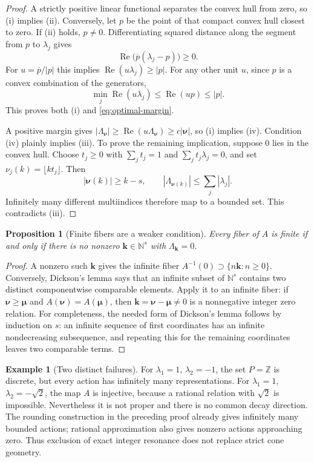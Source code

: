\documentclass[11pt,a4paper]{article}
\numberwithin{equation}{section}
\newtheorem{proposition}[theorem]{Proposition}
\theoremstyle{definition}
\newtheorem{example}[theorem]{Example}
\theoremstyle{remark}
\newcommand{\N}{\mathbb N}
\newcommand{\Z}{\mathbb Z}
\newcommand{\Rea}{\operatorname{Re}}
\newcommand{\nn}{\boldsymbol\nu}
\newcommand{\mm}{\boldsymbol\mu}
\newcommand{\kk}{\boldsymbol k}
\begin{document}
\begin{proof}
A strictly positive linear functional separates the convex hull from zero,
so (i) implies (ii). Conversely, let $p$ be the point of that compact convex
hull closest to zero. If (ii) holds, $p\ne0$. Differentiating squared distance
along the segment from $p$ to $\lambda_j$ gives
\[
 \Rea\bigl(\overline p(\lambda_j-p)\bigr)\ge0.
\]
For $u=\overline p/|p|$ this implies $\Rea(u\lambda_j)\ge|p|$. For any other
unit $u$, since $p$ is a convex combination of the generators,
\[
 \min_j\Rea(u\lambda_j)\le\Rea(up)\le|p|.
\]
This proves both (i) and \eqref{eq:optimal-margin}.

A positive margin gives
$|\Lambda_{\nn}|\ge\Rea(u\Lambda_{\nn})\ge c|\nn|$, so (i) implies (iv).
Condition (iv) plainly implies (iii). To prove the remaining implication,
suppose $0$ lies in the convex hull. Choose $t_j\ge0$ with
$\sum_jt_j=1$ and $\sum_jt_j\lambda_j=0$, and set
$\nu_j(k)=\lfloor kt_j\rfloor$. Then
\[
 |\nn(k)|\ge k-s,\qquad
 |\Lambda_{\nn(k)}|
 \le\sum_j|\lambda_j|.
\]
Infinitely many different multiindices therefore map to a bounded set. This
contradicts (iii).
\end{proof}

\begin{proposition}[Finite fibers are a weaker condition]\label{prop:fibers}
Every fiber of $A$ is finite if and only if there is no nonzero
$\kk\in\N^s$ with $\Lambda_{\kk}=0$.
\end{proposition}

\begin{proof}
A nonzero such $\kk$ gives the infinite fiber $A^{-1}(0)\supset\{n\kk:n\ge0\}$.
Conversely, Dickson's lemma says that an infinite subset of $\N^s$ contains
two distinct componentwise comparable elements. Apply it to an infinite
fiber: if $\nn\ge\mm$ and $A(\nn)=A(\mm)$, then
$\kk=\nn-\mm\ne0$ is a nonnegative integer zero relation.
For completeness, the needed form of Dickson's lemma follows by induction
on $s$: an infinite sequence of first coordinates has an infinite
nondecreasing subsequence, and repeating this for the remaining coordinates
leaves two comparable terms.
\end{proof}

\begin{example}[Two distinct failures]\label{ex:cone-failures}
For $\lambda_1=1$, $\lambda_2=-1$, the set $P=\Z$ is discrete, but every
action has infinitely many representations. For $\lambda_1=1$,
$\lambda_2=-\sqrt2$, the map $A$ is injective, because a rational relation
with $\sqrt2$ is impossible. Nevertheless it is not proper and there is
no common decay direction. The rounding construction in the preceding
proof already gives infinitely many bounded actions; rational approximation
also gives nonzero actions approaching zero. Thus exclusion of exact
integer resonance does not replace strict cone geometry.
\end{example}
\end{document}

